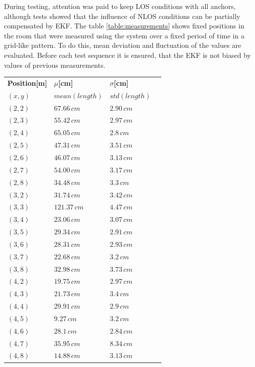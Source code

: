 \documentclass[conference, a4paper]{IEEEtran}
\begin{document}
During testing, attention was paid to keep \ac{LOS} conditions with all anchors,
although tests showed that the influence of \ac{NLOS} conditions can be partially compensated by \ac{EKF}.
The table \ref{table:measurements} shows fixed positions in the room that were measured using the system
over a fixed period of time in a grid-like pattern. 
To do this, mean deviation and fluctuation of the values are evaluated. 
Before each test sequence it is ensured, that the \ac{EKF} is not biased by values of previous measurements. 

\begin{table}[hbt!]
	\centering
	\begin{tabular}{l l l c}
		\textbf{Position[m]} & \textbf{$\mu$[cm]} & \textbf{$\sigma$[cm]}\\
		$(x,y)$ & $mean(length)$ & $std(length)$\\
		$(2,2)$ & $67.66\,cm$ & $2.90\,cm$\\
		$(2,3)$ & $55.42\,cm$ & $2.97\,cm$\\
		$(2,4)$ & $65.05\,cm$ & $2.8\,cm$\\
		$(2,5)$ & $47.31\,cm$ & $3.51\,cm$\\
		$(2,6)$ & $46.07\,cm$ & $3.13\,cm$\\
		$(2,7)$ & $54.00\,cm$ & $3.17\,cm$\\
		$(2,8)$ & $34.48\,cm$ & $3.3\,cm$\\
		
		$(3,2)$ & $31.74\,cm$ & $3.42\,cm$\\
		$(3,3)$ & $121.37\,cm$ & $4.47\,cm$\\
		$(3,4)$ & $23.06\,cm$ & $3.07\,cm$\\
		$(3,5)$ & $29.34\,cm$ & $2.91\,cm$\\
		$(3,6)$ & $28.31\,cm$ & $2.93\,cm$\\
		$(3,7)$ & $22.68\,cm$ & $3.2\,cm$\\
		$(3,8)$ & $32.98\,cm$ & $3.73\,cm$\\
		
		$(4,2)$ & $19.75\,cm$ & $2.97\,cm$\\
		$(4,3)$ & $21.73\,cm$ & $3.4\,cm$\\
		$(4,4)$ & $29.91\,cm$ & $2.9\,cm$\\
		$(4,5)$ & $9.27\,cm$ & $3.2\,cm$\\
		$(4,6)$ & $28.1\,cm$ & $2.84\,cm$\\
		$(4,7)$ & $35.95\,cm$ & $8.34\,cm$\\
		$(4,8)$ & $14.88\,cm$ & $3.13\,cm$\\
		

\end{tabular}
\end{table}
\end{document}
